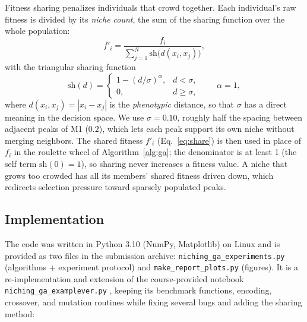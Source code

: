 \documentclass[conference]{IEEEtran}
\begin{document}
Fitness sharing \cite{b3} penalizes individuals that crowd together. Each
individual's raw fitness is divided by its \emph{niche count}, the sum of the
sharing function over the whole population:
\begin{equation}
f'_i = \frac{f_i}{\sum_{j=1}^{N} \mathrm{sh}\big(d(x_i,x_j)\big)},
\label{eq:share}
\end{equation}
with the triangular sharing function
\begin{equation}
\mathrm{sh}(d) =
\begin{cases}
1 - (d/\sigma)^{\alpha}, & d < \sigma,\\
0, & d \ge \sigma,
\end{cases}
\qquad \alpha = 1,
\label{eq:shfun}
\end{equation}
where $d(x_i,x_j) = |x_i - x_j|$ is the \emph{phenotypic} distance, so that
$\sigma$ has a direct meaning in the decision space. We use $\sigma = 0.10$,
roughly half the spacing between adjacent peaks of M1 ($0.2$), which lets each
peak support its own niche without merging neighbors. The shared fitness
$f'_i$ (Eq.~\eqref{eq:share}) is then used in place of $f_i$ in the roulette
wheel of Algorithm~\ref{alg:ga}; the denominator is at least 1 (the self term
$\mathrm{sh}(0)=1$), so sharing never increases a fitness value. A niche that
grows too crowded has all its members' shared fitness driven down, which
redirects selection pressure toward sparsely populated peaks.

\subsection{Implementation}
\label{sec:impl}

The code was written in Python 3.10 (NumPy, Matplotlib) on Linux and is
provided as two files in the submission archive:
\texttt{niching\_ga\_experiments.py} (algorithms + experiment protocol) and
\texttt{make\_report\_plots.py} (figures). It is a re-implementation and
extension of the course-provided notebook
\texttt{niching\_ga\_examplever.py} \cite{b4}, keeping its benchmark
functions, encoding, crossover, and mutation routines while fixing several
bugs and adding the sharing method:
\end{document}
